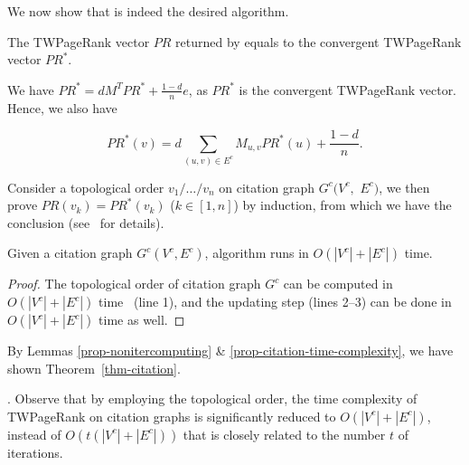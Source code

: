 {We now show that \twprdag is indeed the desired algorithm.

\begin{lemma}
\label{prop-nonitercomputing}
The TWPageRank vector $PR$ returned by \twprdag equals to the convergent TWPageRank vector $PR^*$.
\end{lemma}

\begin{proofSketch}
We have $PR^* = d M^T PR^* + \frac{1-d}{n} e$, as $PR^*$ is the convergent TWPageRank vector. Hence, we also have
\begin{small}
\begin{equation}
PR^*(v)=d \sum_{(u,v)\in E^c} M_{u,v} PR^*(u) + \frac{1-d}{n}.
\end{equation}
\end{small}

\vspace{-1ex}
Consider a topological order $v_1/\dots/v_n$ on citation graph $G^c(V^c,$ $E^c)$, we then prove $PR(v_k)=PR^*(v_k)$ ($k\in[1,n]$) by induction, from which we have the conclusion (see~\cite {ERank-full} for details).
\end{proofSketch}


\begin{lemma}
\label{prop-citation-time-complexity}
Given a citation graph $G^c(V^c, E^c)$, algorithm \twprdag runs in $O(|V^c|+|E^c|)$ time.
\end{lemma}


\begin{proof}
The topological order of citation graph $G^c$ can be computed in  $O(|V^c|+|E^c|)$ time~\cite{CormenLRS01} (line 1), and the updating step (lines 2--3) can be done in $O(|V^c|+|E^c|)$ time as well.
\end{proof}




By Lemmas \ref{prop-nonitercomputing} \& \ref{prop-citation-time-complexity}, we have shown Theorem~\ref{thm-citation}.

. Observe that by employing the topological order, the time complexity of TWPageRank on citation graphs is significantly reduced to $O(|V^c|+|E^c|)$, instead of $O(t(|V^c|+|E^c|))$ that is closely related to the number $t$ of iterations.



}
